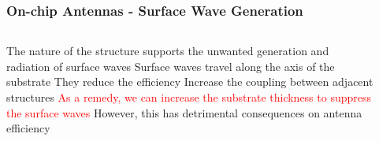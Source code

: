 \documentclass[10pt]{beamer}
\begin{document}
\begin{frame}
    \frametitle{On-chip Antennas - Surface Wave Generation}
    \begin{columns}[T]
        \begin{column}{.5\textwidth}
            \begin{outline}
                \1 The nature of the structure supports the unwanted generation and radiation of surface waves
                \1 Surface waves travel along the axis of the substrate
                \2 They reduce the efficiency
                \2 Increase the coupling between adjacent structures
                \1 \textcolor{red}{As a remedy, we can increase the substrate thickness to suppress the surface waves}
                \2 However, this has detrimental consequences on antenna efficiency
            \end{outline}
        \end{column}
        \begin{column}{.5\textwidth}
            \begin{figure}[T!]
                \centering
                 \\
            \end{figure}
        \end{column}
    \end{columns}
\end{frame}
\end{document}
